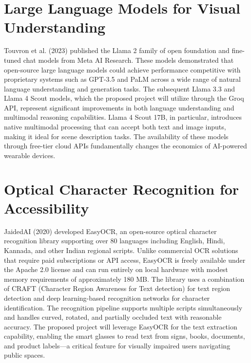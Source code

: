 \section{Large Language Models for Visual Understanding}
Touvron et al. (2023) published the Llama 2 family of open foundation and fine-tuned chat models from Meta AI Research. These models demonstrated that open-source large language models could achieve performance competitive with proprietary systems such as GPT-3.5 and PaLM across a wide range of natural language understanding and generation tasks. The subsequent Llama 3.3 and Llama 4 Scout models, which the proposed project will utilize through the Groq API, represent significant improvements in both language understanding and multimodal reasoning capabilities. Llama 4 Scout 17B, in particular, introduces native multimodal processing that can accept both text and image inputs, making it ideal for scene description tasks. The availability of these models through free-tier cloud APIs fundamentally changes the economics of AI-powered wearable devices.

\section{Optical Character Recognition for Accessibility}
JaidedAI (2020) developed EasyOCR, an open-source optical character recognition library supporting over 80 languages including English, Hindi, Kannada, and other Indian regional scripts. Unlike commercial OCR solutions that require paid subscriptions or API access, EasyOCR is freely available under the Apache 2.0 license and can run entirely on local hardware with modest memory requirements of approximately 180 MB. The library uses a combination of CRAFT (Character Region Awareness for Text detection) for text region detection and deep learning-based recognition networks for character identification. The recognition pipeline supports multiple scripts simultaneously and handles curved, rotated, and partially occluded text with reasonable accuracy. The proposed project will leverage EasyOCR for the text extraction capability, enabling the smart glasses to read text from signs, books, documents, and product labels---a critical feature for visually impaired users navigating public spaces.

